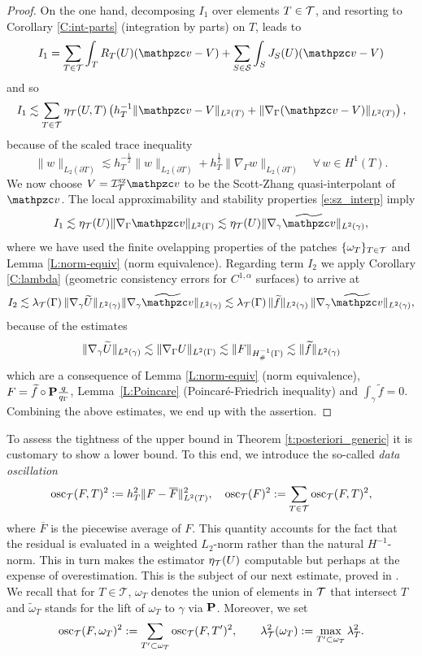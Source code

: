 \begin{proof}
On the one hand, decomposing $I_1$ over elements $T\in \mathcal{T}$, and resorting to
Corollary \ref{C:int-parts} (integration by parts) on $T$, leads to
%
\begin{equation}\label{e:I1}
I_1 = \sum_{T\in \T}\int_T R_T(U)(\tv-V) + \sum_{S \in\mathcal{S}}\int_{S} J_S(U)(\tv-V)
\end{equation}
and so
$$
I_1 \lesssim \sum_{T\in \T} \eta_{\T}(U,T)\left( h^{-1}_T \| \tv-V\|_{L^2(T)} + \|\nabla_\Gamma (\tv-V) \|_{L^2(T)}\right),
$$
%
because of the scaled trace inequality
%
\[
\|w\|_{L_2(\partial T)} \lesssim h_T^{-\frac12} \|w\|_{L_2(\partial T)}
+ h_T^{\frac12} \|\nabla_\Gamma w\|_{L_2(\partial T)}
\quad\forall \, w\in H^1(T).
\]
%
We now choose $V= \interp^{\textsc{sz}} \tv$ to be the Scott-Zhang
quasi-interpolant of $\tv$.
The local approximability and stability properties \eqref{e:sz_interp} imply
%
\begin{equation}\label{e:post_I1}
  I_1\lesssim \eta_{\T}(U) \| \nabla_\Gamma \tv \|_{L^2(\Gamma)}
  \lesssim \eta_{\T}(U) \| \nabla_\gamma \widetilde \tv \|_{L^2(\gamma)},
\end{equation}
%
where we have used the finite ovelapping properties of the patches $\{\omega_T\}_{T\in\mathcal{T}}$
and Lemma \ref{L:norm-equiv} (norm equivalence).
Regarding term $I_2$ we apply Corollary \ref{C:lambda} (geometric consistency errors
for $C^{1,\alpha}$ surfaces) to arrive at
%
$$
I_2 \lesssim \lambda_\T(\Gamma) \,
\| \nabla_{\gamma}\widetilde U \|_{L^2(\gamma)} \| \nabla_\gamma \widetilde \tv \|_{L^2(\gamma)}
\lesssim \lambda_\T(\Gamma) \, \| \wf \|_{L^2(\gamma)}
\, \| \nabla_\gamma \widetilde \tv \|_{L^2(\gamma)},
 $$
because of the estimates
$$
\| \nabla_{\gamma}\widetilde U \|_{L^2(\gamma)} \lesssim
\| \nabla_{\Gamma}  U \|_{L^2(\Gamma)}  \lesssim \| F \|_{H^{-1}_\#(\Gamma)}
\lesssim \| \widetilde{f} \|_{L^2(\gamma)}
$$
which are a consequence of Lemma \ref{L:norm-equiv} (norm equivalence), $F = \widetilde{f}\circ{\bf P} \frac{q}{q_\Gamma}$, Lemma~\ref{L:Poincare} (Poincar\'e-Friedrich inequality) and $\int_\gamma \widetilde f = 0$.
Combining the above estimates, we end up with the assertion.
\end{proof}

To assess the tightness of the upper bound in Theorem \ref{t:posteriori_generic}
it is customary to show a lower bound. To this end, we introduce the so-called
{\it data oscillation}
%
\[
\mathrm{osc}_{\mathcal{T}}(F,T)^2 := h_T^2 \| F - \overline{F} \|_{L^2(T)}^2,
\quad
\mathrm{osc}_{\mathcal{T}}(F)^2:= \sum_{T\in \mathcal{T}} \mathrm{osc}_{\mathcal{T}}(F,T)^2,
\]
%
where $\overline F$ is the piecewise average of $F$. This quantity
accounts for the fact that the residual is evaluated in a weighted
$L_2$-norm rather than the natural $H^{-1}$-norm. This in turn makes the estimator
$\eta_{\mathcal{T}}(U)$ computable but perhaps at the expense of overestimation. This is
the subject of our next estimate, proved in \cite{BCMN:Magenes}.
We recall that for $T\in \mathcal T$, $\omega_T$ denotes the union of elements
in $\mathcal{T}$ that intersect $T$ and $\widetilde \omega_T$ stands for the lift of
$\omega_T$  to $\gamma$ via ${\bf P}$. Moreover, we set
%
\[
\operatorname{osc}_{\mathcal{T}}(F,\omega_T)^2 := \sum_{T'\subset\omega_T} \operatorname{osc}_{\mathcal{T}}(F,T')^2,
\qquad
\lambda^2_{\mathcal{T}}(\omega_T) := \max_{T'\subset\omega_T} \lambda^2_T.
\]
%


